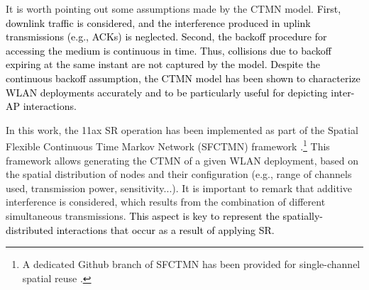 \documentclass[preprint,12pt]{elsarticle}
\begin{document}
It is worth pointing out some assumptions made by the CTMN model. \textcolor{black}{First, downlink traffic is considered, and the interference produced in uplink transmissions (e.g., ACKs) is neglected. Second, the backoff procedure for accessing the medium is continuous in time. Thus, collisions due to backoff expiring at the same instant are not captured by the model. Despite the continuous backoff assumption, the CTMN model has been shown to characterize WLAN deployments accurately \cite{bellalta2016throughput,michaloliakos2016performance} and to be particularly useful for depicting inter-AP interactions.}



In this work, the 11ax SR operation has been implemented as part of the Spatial Flexible Continuous Time Markov Network (SFCTMN) framework \cite{barrachina2019dynamic, barrachina2019overlap, wilhelmi2019potential}.\footnote{A dedicated Github branch of SFCTMN has been provided for single-channel spatial reuse \cite{wilhelmi2019sfctm_spatial_reuse}.} This framework allows generating the CTMN of a given WLAN deployment, based on the spatial distribution of nodes and their configuration (e.g., range of channels used, transmission power, sensitivity...). It is important to remark that additive interference is considered, which results from the combination of different simultaneous transmissions. \textcolor{black}{This aspect is key to represent the spatially-distributed interactions that occur as a result of applying SR.}
\end{document}
